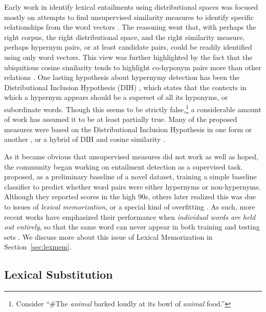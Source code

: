 \documentclass[12pt]{article}
\begin{document}
Early work in identify lexical entailments using distributional spaces was
focused mostly on attempts to find unsupervised similarity measures to identify
specific relationships from the word vectors
\cite{weeds:2004:coling,clarke:2009:gems,kotlerman:2010:nle,lenci:2012:starsem,santus:2013:thesis}.
The reasoning went that, with perhaps the right corpus, the right
distributional space, and the right similarity measure, perhaps hypernym pairs,
or at least candidate pairs, could be readily identified using only word
vectors. This view was further highlighted by the fact that the ubiquitious
cosine similarity tends to highlight co-hyponym pairs more than other relations
\cite{weeds:2004:coling,baroni:2011:gems}.  One lasting hypothesis about
hypernymy detection has been the Distributional Inclusion Hypothesis (DIH)
\cite{zhitomirsky-geffet:2005:acl}, which states that the contexts in which a
hypernym appears should be a superset of all its hyponyms, or subordinate
words. Though this seems to be strictly false,\footnote{Consider ``\#The {\em
animal} barked loudly at its bowl of {\em animal} food.''} a considerable
amount of work has assumed it to be at least partially true.  Many of the
proposed measures were based on the Distributional Inclusion Hypothesis in one
form or another \cite{clarke:2009:gems}, or a hybrid of DIH and cosine
similarity \cite{kotlerman:2010:nle,lenci:2012:starsem}.

As it became obvious that unsupervised measures did not work as
well as hoped, the community began working on entailment detection as a
supervised task.  proposed, as a preliminary baseline
of a novel dataset, training a simple baseline classifier to predict whether
word pairs were either hypernyms or non-hypernyms. Although they reported scores
in the high 90s, others later realized this was due to issues of {\em lexical
memorization}, or a special kind of overfitting
\cite{roller:2014:coling,weeds:2014:coling,levy:2015:naacl}. As such, more
recent works have emphasized their performance when {\em individual words are
held out entirely}, so that the same word can never appear in both training and
testing sets
\cite{roller:2014:coling,kruszewski:2015:tacl,levy:2015:naacl,shwartz:2016:acl,roller:2016:naacl}.
We discuss more about this issue of Lexical Memorization in
Section~\ref{sec:lexmem}.

\subsection{Lexical Substitution}
\label{sec:lexsub}
\end{document}
